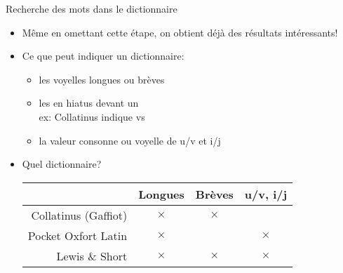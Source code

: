 \documentclass{beamer}
\newcommand{\lettre}[1]{\emph{\structure{#1}}}
\newcommand{\latin}[1]{\structure{#1}}
\newcommand{\crx}{$\times$}
\begin{document}
\begin{frame}{Recherche des mots dans le dictionnaire}  %

\begin{itemize}
\item Même en omettant cette étape, on obtient déjà des résultats intéressants!

\vfill

\item Ce que peut indiquer un dictionnaire:

\begin{itemize}
\item les voyelles longues ou brèves 
\item les \lettre{e} en hiatus devant un \lettre{u} \\
ex: Collatinus indique \latin{m{\u e}us} vs \latin{seu}
\item la valeur consonne ou voyelle de u/v et i/j
\end{itemize}

\vfill

\item Quel dictionnaire?

\begin{tabular}{r c c c}
				& Longues & Brèves & u/v, i/j \\
\hline
Collatinus (Gaffiot)		& \crx    & \crx   &  \\
Pocket Oxfort Latin & \crx &       & \crx \\
Lewis \& Short	& \crx    & \crx   & \crx \\
\hline
\end{tabular}


\end{itemize}

\end{frame} %
\end{document}
